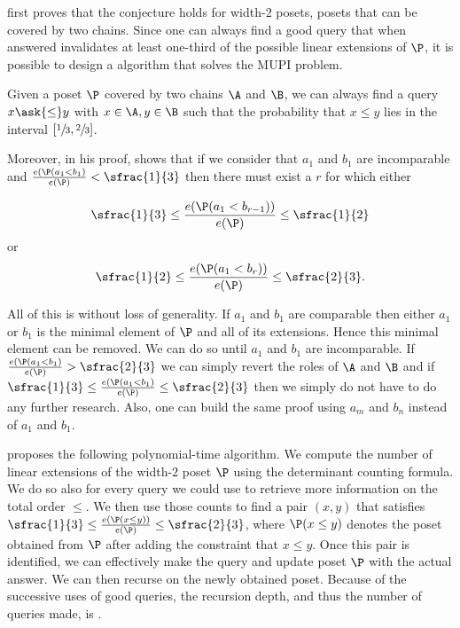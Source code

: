 \citet*{linial:1984} first proves that the \onethirdtwothird conjecture holds
for width-\(2\) posets, \ie posets that can be covered by two chains. Since one
can always find a good query that when answered invalidates at
least one-third of the possible linear extensions of \(\P\), it is possible to design a
 algorithm that solves the MUPI problem.

\begin{theorem}
Given a poset \(\P\) covered by two chains \(\A\) and \(\B\), we can always find
a query \(x \ask{\le} y\) with \(x \in \A, y \in \B\) such that the probability
that \(x \le y\) lies in the interval \([\sfrac{1}{3}, \sfrac{2}{3}]\).
\end{theorem}

Moreover, in his proof, \citet*{linial:1984} shows that if we consider that \(
a_1\) and \(b_1\) are incomparable and \(\frac{e(\P(a_1 < b_1)}{e(\P)} <
\sfrac{1}{3}\) then there must exist a \(r\) for which either

\begin{displaymath}
\sfrac{1}{3} \le \frac{e(\P(a_1 < b_{r-1}))}{e(\P)} \le \sfrac{1}{2}
\end{displaymath}
or
\begin{displaymath}
\sfrac{1}{2} \le \frac{e(\P(a_1 < b_{r}))}{e(\P)} \le \sfrac{2}{3}.
\end{displaymath}

All of this is without loss of generality. If \(a_1\) and \(b_1\) are
comparable then either \(a_1\) or \(b_1\) is the minimal element of \(\P\) and
all of its extensions. Hence this minimal element can be removed. We can do so
until \(a_1\) and \(b_1\) are incomparable. If \(\frac{e(\P(a_1 < b_1)}{e(\P)} >
\sfrac{2}{3}\) we can simply revert the roles of \(\A\) and \(\B\) and if
\(\sfrac{1}{3} \le \frac{e(\P(a_1 < b_1)}{e(\P)} \le \sfrac{2}{3}\) then we
simply do not have to do any further research. Also, one can build the same
proof using \(a_m\) and \(b_n\) instead of \(a_1\) and \(b_1\).

\citet*{linial:1984} proposes the following polynomial-time algorithm. We
compute the number of linear extensions of the width-\(2\) poset \(\P\) using
the determinant counting formula. We do so also for every query we could use to
retrieve more information on the total order \(\le\). We then use those counts
to find a pair \((x,y)\) that satisfies \(\sfrac{1}{3} \le \frac{e(\P(x \le
y))}{e(\P)} \le \sfrac{2}{3}\), where \(\P(x \le y)\) denotes the poset obtained
from \(\P\) after adding the constraint that \(x \le y\). Once this pair is
identified, we can effectively make the query and update poset \(\P\) with the
actual answer. We can then recurse on the newly obtained poset. Because of the
successive uses of good queries, the recursion depth, and thus the number of
queries made, is .

